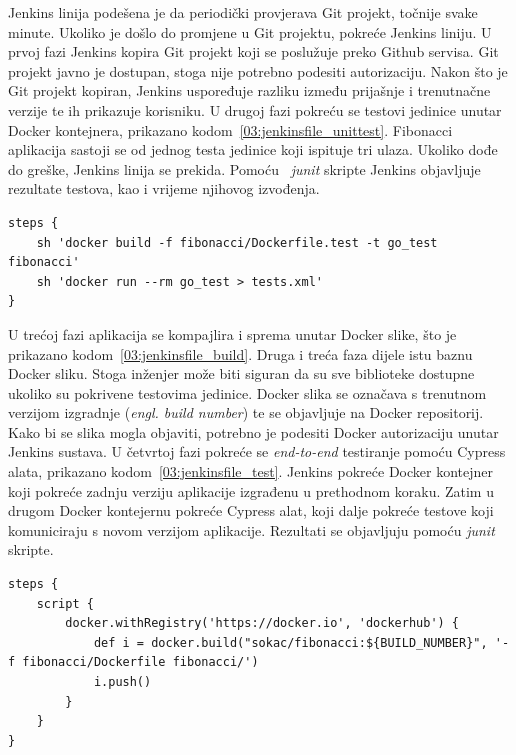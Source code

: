 Jenkins linija podešena je da periodički provjerava Git projekt, točnije svake minute. Ukoliko je
došlo do promjene u Git projektu, pokreće Jenkins liniju. U prvoj fazi Jenkins kopira Git projekt
koji se poslužuje preko Github servisa. Git projekt javno je dostupan, stoga nije potrebno podesiti
autorizaciju. Nakon što je Git projekt kopiran, Jenkins uspoređuje razliku između prijašnje i
trenutnačne verzije te ih prikazuje korisniku. U drugoj fazi pokreću se testovi jedinice unutar
Docker kontejnera, prikazano kodom~\ref{03:jenkinsfile_unittest}. Fibonacci aplikacija sastoji se od
jednog testa jedinice koji ispituje tri ulaza. Ukoliko dođe do greške, Jenkins linija se prekida.
Pomoću ~\textit{junit} skripte Jenkins objavljuje rezultate testova, kao i vrijeme njihovog
izvođenja.

\begin{lstlisting}[float=h]
steps {
    sh 'docker build -f fibonacci/Dockerfile.test -t go_test fibonacci'
    sh 'docker run --rm go_test > tests.xml'
}
\end{lstlisting}

U trećoj fazi aplikacija se kompajlira i sprema unutar Docker slike, što je prikazano
kodom~\ref{03:jenkinsfile_build}. Druga i treća faza dijele istu baznu Docker sliku. Stoga inženjer
može biti siguran da su sve biblioteke dostupne ukoliko su pokrivene testovima jedinice. Docker
slika se označava s trenutnom verzijom izgradnje (\textit{engl. build number}) te se objavljuje na
Docker repositorij. Kako bi se slika mogla objaviti, potrebno je podesiti Docker autorizaciju unutar
Jenkins sustava. U četvrtoj fazi pokreće se \textit{end-to-end} testiranje pomoću Cypress alata,
prikazano kodom~\ref{03:jenkinsfile_test}. Jenkins pokreće Docker kontejner koji pokreće zadnju
verziju aplikacije izgrađenu u prethodnom koraku. Zatim u drugom Docker kontejernu pokreće Cypress
alat, koji dalje pokreće testove koji komuniciraju s novom verzijom aplikacije. Rezultati se
objavljuju pomoću \textit{junit} skripte.

\begin{lstlisting}[float=h]
steps {
    script {
        docker.withRegistry('https://docker.io', 'dockerhub') {
            def i = docker.build("sokac/fibonacci:${BUILD_NUMBER}", '-f fibonacci/Dockerfile fibonacci/')
            i.push()
        }
    }
}
\end{lstlisting}

